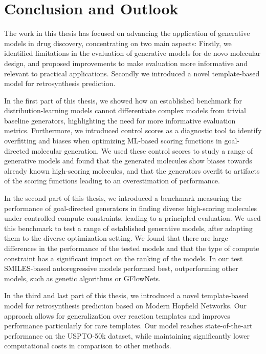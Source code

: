 \chapter{Conclusion and Outlook\label{chap:conclusion}}

The work in this thesis has focused on advancing the application of generative models in drug
discovery, concentrating on two main aspects: Firstly, we identified limitations in the evaluation
of generative models for de novo molecular design, and proposed improvements to make evaluation more
informative and relevant to practical applications. Secondly we introduced a novel template-based
model for retrosynthesis prediction.

In the first part of this thesis, we showed how an established benchmark for distribution-learning
models cannot differentiate complex models from trivial baseline generators, highlighting the need
for more informative evaluation metrics. Furthermore, we introduced control scores as a diagnostic
tool to identify overfitting and biases when optimizing \ac{ML}-based scoring functions in
goal-directed molecular generation. We used these control scores to study a range of generative
models and found that the generated molecules show biases towards already known high-scoring
molecules, and that the generators overfit to artifacts of the scoring functions leading to an
overestimation of performance.

In the second part of this thesis, we introduced a benchmark measuring the performance of
goal-directed generators in finding diverse high-scoring molecules under controlled compute
constraints, leading to a principled evaluation. We used this benchmark to test a range of
established generative models, after adapting them to the diverse optimization setting. We found
that there are large differences in the performance of the tested models and that the type of
compute constraint has a significant impact on the ranking of the models. In our test
SMILES-based autoregressive models performed best, outperforming other models, such as genetic
algorithms or GFlowNets.

In the third and last part of this thesis, we introduced a novel template-based model for
retrosynthesis prediction based on Modern Hopfield Networks. Our approach allows for generalization
over reaction templates and improves performance particularly for rare templates. Our model reaches
state-of-the-art performance on the USPTO-50k dataset, while maintaining significantly lower
computational costs in comparison to other methods.

